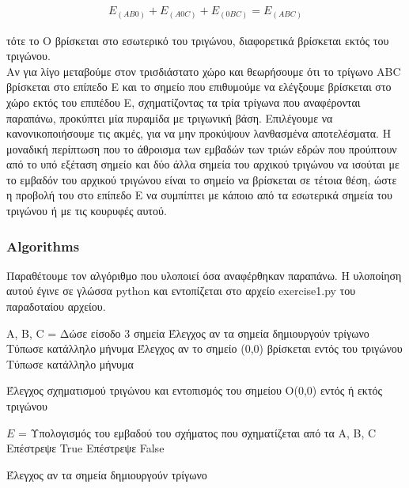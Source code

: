 \documentclass[12pt]{article}
\begin{document}
\begin{align*}
E_{(AB0)} + E_{(A0C)} + E_{(0BC)} = E_{(ABC)}
\end{align*}

τότε το O βρίσκεται στο εσωτερικό του τριγώνου, διαφορετικά βρίσκεται εκτός του τριγώνου. \\  

Αν για λίγο μεταβούμε στον τρισδιάστατο χώρο και θεωρήσουμε ότι το τρίγωνο ABC βρίσκεται στο επίπεδο E και το σημείο που επιθυμούμε να ελέγξουμε βρίσκεται στο χώρο εκτός του επιπέδου Ε, σχηματίζοντας τα τρία τρίγωνα που αναφέρονται παραπάνω, προκύπτει μία πυραμίδα με τριγωνική βάση. Επιλέγουμε να κανονικοποιήσουμε τις ακμές, για να μην προκύψουν λανθασμένα αποτελέσματα. Η μοναδική περίπτωση που το άθροισμα των εμβαδών των τριών εδρών που προύπτουν από το υπό εξέταση σημείο και δύο άλλα σημεία του αρχικού τριγώνου να ισούται με το εμβαδόν του αρχικού τριγώνου είναι το σημείο να βρίσκεται σε τέτοια θέση, ώστε η προβολή του στο επίπεδο E να συμπίπτει με κάποιο από τα εσωτερικά σημεία του τριγώνου ή με τις κουρυφές αυτού. \\

\subsubsection*{Algorithms}

Παραθέτουμε τον αλγόριθμο που υλοποιεί όσα αναφέρθηκαν παραπάνω. Η υλοποίηση αυτού έγινε σε γλώσσα python και εντοπίζεται στο αρχείο exercise1.py του παραδοταίου αρχείου.

\begin{algorithm}[H]
	\SetAlgoLined
	
	A, B, C = Δώσε είσοδο 3 σημεία \;
	Έλεγχος αν τα σημεία δημιουργούν τρίγωνο \;
	{Τύπωσε κατάλληλο μήνυμα \;
	Έλεγχος αν το σημείο (0,0) βρίσκεται εντός του τριγώνου \;}
	{Τύπωσε κατάλληλο μήνυμα \;}
	
	\caption{Έλεγχος σχηματισμού τριγώνου και εντοπισμός του σημείου O(0,0) εντός ή εκτός τριγώνου}
\end{algorithm}

\begin{algorithm}[H]
	\SetAlgoLined
	
	\(Ε\) = Υπολογισμός του εμβαδού του σχήματος που σχηματίζεται από τα A, B, C \;
	{Επέστρεψε True \;}
	{Επέστρεψε False \;}
	
	\caption{Έλεγχος αν τα σημεία δημιουργούν τρίγωνο}
\end{algorithm}
\end{document}
